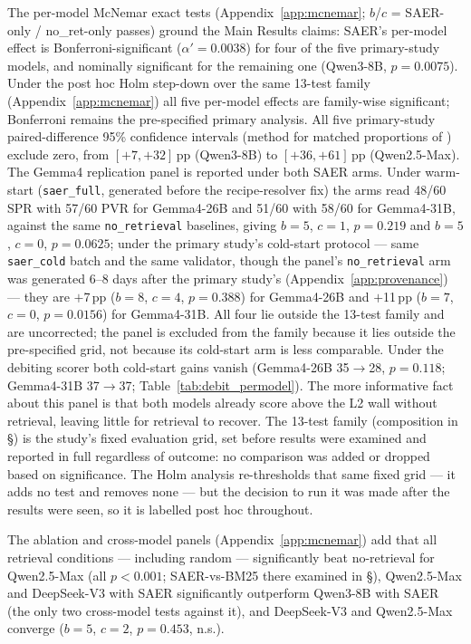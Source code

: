 \documentclass[letterpaper]{article} %
\newcommand{\appref}[1]{Appendix~\ref{#1}}
\newcommand{\bodyref}[1]{\getrefnumber{#1}}
\begin{document}
The per-model McNemar exact tests (\appref{app:mcnemar};
$b$/$c$ = SAER-only / no\_ret-only passes) ground the
Main Results claims: SAER's per-model effect is Bonferroni-significant
($\alpha'{=}0.0038$) for four of the five primary-study models, and
nominally significant for the remaining one (Qwen3-8B, $p{=}0.0075$).
Under the post hoc Holm step-down over the same 13-test family
(\appref{app:mcnemar}) all five per-model effects are family-wise
significant; Bonferroni remains the pre-specified primary analysis.
All five primary-study paired-difference 95\% confidence intervals
(method for matched proportions of \citet{newcombe1998improved}) exclude zero, from
$[{+}7,{+}32]$\,pp (Qwen3-8B) to $[{+}36,{+}61]$\,pp (Qwen2.5-Max).  The
Gemma4 replication panel is reported under both SAER arms.  Under
warm-start (\texttt{saer\_full}, generated before the recipe-resolver fix) the arms read
48/60 SPR with 57/60 PVR for Gemma4-26B and 51/60 with 58/60 for Gemma4-31B,
against the same \texttt{no\_retrieval} baselines, giving $b{=}5$, $c{=}1$,
$p{=}0.219$ and $b{=}5$, $c{=}0$, $p{=}0.0625$; under the primary study's cold-start protocol
--- same \texttt{saer\_cold} batch and the same validator, though the panel's
\texttt{no\_retrieval} arm was generated 6--8 days after the primary study's
(\appref{app:provenance}) --- they are $+$7\,pp ($b{=}8$, $c{=}4$, $p{=}0.388$) for Gemma4-26B and $+$11\,pp
($b{=}7$, $c{=}0$, $p{=}0.0156$) for Gemma4-31B.  All four lie outside the
13-test family and are uncorrected; the panel is excluded from the family
because it lies outside the pre-specified grid, not because its cold-start arm
is less comparable.  Under the debiting scorer both cold-start gains vanish
(Gemma4-26B 35$\to$28, $p{=}0.118$; Gemma4-31B 37$\to$37;
Table~\ref{tab:debit_permodel}).  The more informative fact about this
panel is that both models already score above the L2 wall without
retrieval, leaving little for retrieval to recover.
The 13-test family (composition in \S\bodyref{sec:protocol}) is the study's fixed evaluation
grid, set before results were examined and reported in full regardless of
outcome: no comparison was added or dropped based on significance.  The
Holm analysis re-thresholds that same fixed grid --- it adds no test and
removes none --- but the decision to run it was made after the results
were seen, so it is labelled post hoc throughout.



The ablation and cross-model panels (\appref{app:mcnemar}) add that all retrieval conditions --- including random --- significantly
beat no-retrieval for Qwen2.5-Max (all $p{<}0.001$; SAER-vs-BM25 there
examined in \S\bodyref{sec:ablation}), Qwen2.5-Max and DeepSeek-V3 with SAER significantly
outperform Qwen3-8B with SAER (the only two cross-model tests against it), and
DeepSeek-V3 and Qwen2.5-Max converge ($b{=}5$, $c{=}2$,
$p{=}0.453$, n.s.).
\end{document}
